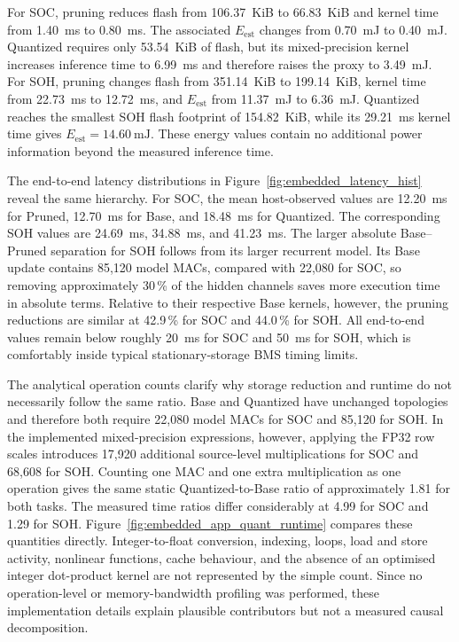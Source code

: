 \documentclass[
    a4paper,
    12pt,
    titlepage,
    bibliography=totoc,
    twoside=on,
    parskip=false,
    numbers=noenddot,
    cleardoublepage=empty,
    DIV=12,
    BCOR=12.0mm,
    headheight=36pt,
    headings=openright
]{scrreprt}
\begin{document}
For SOC, pruning reduces flash from 106.37~KiB to 66.83~KiB and kernel time from \SI{1.40}{\milli\second} to \SI{0.80}{\milli\second}. The associated $E_{\mathrm{est}}$ changes from \SI{0.70}{\milli\joule} to \SI{0.40}{\milli\joule}. Quantized requires only 53.54~KiB of flash, but its mixed-precision kernel increases inference time to \SI{6.99}{\milli\second} and therefore raises the proxy to \SI{3.49}{\milli\joule}. For SOH, pruning changes flash from 351.14~KiB to 199.14~KiB, kernel time from \SI{22.73}{\milli\second} to \SI{12.72}{\milli\second}, and $E_{\mathrm{est}}$ from \SI{11.37}{\milli\joule} to \SI{6.36}{\milli\joule}. Quantized reaches the smallest SOH flash footprint of 154.82~KiB, while its \SI{29.21}{\milli\second} kernel time gives $E_{\mathrm{est}}=\SI{14.60}{\milli\joule}$. These energy values contain no additional power information beyond the measured inference time.

The end-to-end latency distributions in Figure~\ref{fig:embedded_latency_hist} reveal the same hierarchy. For SOC, the mean host-observed values are \SI{12.20}{\milli\second} for Pruned, \SI{12.70}{\milli\second} for Base, and \SI{18.48}{\milli\second} for Quantized. The corresponding SOH values are \SI{24.69}{\milli\second}, \SI{34.88}{\milli\second}, and \SI{41.23}{\milli\second}. The larger absolute Base--Pruned separation for SOH follows from its larger recurrent model. Its Base update contains 85,120 model MACs, compared with 22,080 for SOC, so removing approximately 30\,\% of the hidden channels saves more execution time in absolute terms. Relative to their respective Base kernels, however, the pruning reductions are similar at 42.9\,\% for SOC and 44.0\,\% for SOH. All end-to-end values remain below roughly \SI{20}{\milli\second} for SOC and \SI{50}{\milli\second} for SOH, which is comfortably inside typical stationary-storage BMS timing limits.\autocite{plettBatteryManagementSystems2015,berecibarCriticalReviewState2016}

The analytical operation counts clarify why storage reduction and runtime do not necessarily follow the same ratio. Base and Quantized have unchanged topologies and therefore both require 22,080 model MACs for SOC and 85,120 for SOH. In the implemented mixed-precision expressions, however, applying the FP32 row scales introduces 17,920 additional source-level multiplications for SOC and 68,608 for SOH. Counting one MAC and one extra multiplication as one operation gives the same static Quantized-to-Base ratio of approximately 1.81 for both tasks. The measured time ratios differ considerably at 4.99 for SOC and 1.29 for SOH. Figure~\ref{fig:embedded_app_quant_runtime} compares these quantities directly. Integer-to-float conversion, indexing, loops, load and store activity, nonlinear functions, cache behaviour, and the absence of an optimised integer dot-product kernel are not represented by the simple count. Since no operation-level or memory-bandwidth profiling was performed, these implementation details explain plausible contributors but not a measured causal decomposition.
\end{document}
